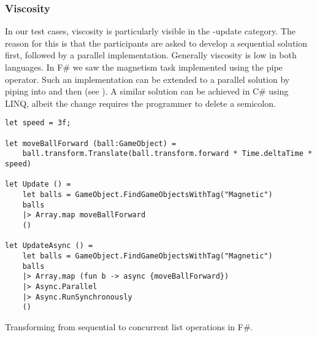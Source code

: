 \subsubsection{Viscosity}
In our test cases, viscosity is particularly visible in the -update category. The reason for this is that the participants are asked to develop a sequential solution first, followed by a parallel implementation. Generally viscosity is low in both languages. In F\# we saw the magnetism task implemented using the pipe operator. Such an implementation can be extended to a parallel solution by piping into  and then  (see ). A similar solution can be achieved in C\# using \gls{LINQ}, albeit the change requires the programmer to delete a semicolon.

\begin{listing}[H]
    \begin{verbatim}
let speed = 3f;

let moveBallForward (ball:GameObject) =
    ball.transform.Translate(ball.transform.forward * Time.deltaTime * speed)

let Update () =
    let balls = GameObject.FindGameObjectsWithTag("Magnetic")
    balls
    |> Array.map moveBallForward
    ()

let UpdateAsync () =
    let balls = GameObject.FindGameObjectsWithTag("Magnetic")
    balls
    |> Array.map (fun b -> async {moveBallForward})
    |> Async.Parallel
    |> Async.RunSynchronously
    ()
    \end{verbatim}
    \caption{Transforming from sequential to concurrent list operations in F\#.}
    \label{lst:fsharp:pipe:async}
\end{listing}

